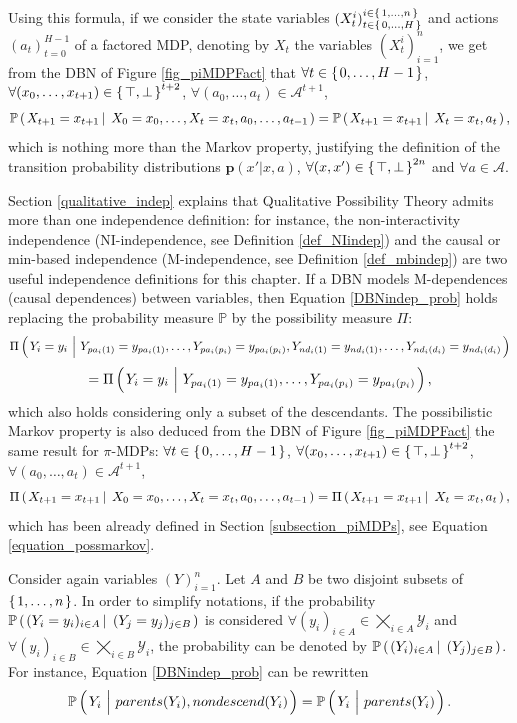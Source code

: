 Using this formula, if we consider the state variables $(X^i_t)_{t \in \left\{ \left. 0,\ldots,H \right. \right\}}^{i \in \left\{ \left. 1,\ldots,n \right. \right\}}$
and actions $(a_t)_{t=0}^{H-1}$
of a factored MDP, 
denoting by $X_t$ the variables $(X^i_t)_{i=1}^n$,
we get from the DBN of Figure \ref{fig_piMDPFact} that
$\forall t \in \left\{ \left.  0,\ldots, H-1 \right. \right\}$, $\forall (x_0,\ldots,x_{t+1}) \in \left\{ \left.  \top, \bot  \right. \right\}^{t+2}$, $\forall (a_0,\ldots,a_t) \in \mathcal{A}^{t+1}$,
\[ \mathbb{P} \left( \left.  X_{t+1}=x_{t+1} \, \right| \left. \, X_0=x_0, \ldots, X_t=x_t, a_0,\ldots,a_{t-1}  \right. \right) = \mathbb{P} \left( \left.  X_{t+1}=x_{t+1} \, \right| \left. \, X_t=x_t, a_t  \right. \right), \]
which is nothing more than the Markov property,
justifying the definition of the transition probability distributions $\textbf{p}(x' \vert x, a)$,
$\forall (x,x') \in \left\{ \left.  \top, \bot  \right. \right\}^{2n}$ and $\forall a \in \mathcal{A}$.

Section \ref{qualitative_indep} explains that Qualitative Possibility Theory 
admits more than one independence definition:
for instance, the non-interactivity independence (NI-independence, see Definition \ref{def_NIindep}) 
and the causal or min-based independence (M-independence, see Definition \ref{def_mbindep})
are two useful independence definitions for this chapter.
If a DBN models M-dependences (causal dependences) 
between variables, 
then Equation \ref{DBNindep_prob} holds 
replacing the probability measure $\mathbb{P}$ 
by the possibility measure $\Pi$:
\[\Pi \paren{ Y_i=y_i \ \Big\vert \ Y_{pa_i(1)}=y_{pa_i(1)},\ldots, Y_{pa_i(p_i)}=y_{pa_i(p_i)}, Y_{nd_i(1)} = y_{nd_i(1)}, \ldots, Y_{nd_i(d_i)} = y_{nd_i(d_i)} }  \]
\begin{equation}
\label{DBN_M_indep}
= \Pi \left( \left.  Y_i=y_i \ \Big\vert \ Y_{pa_i(1)}=y_{pa_i(1)},\ldots, Y_{pa_i(p_i)}=y_{pa_i(p_i)}  \right. \right),
\end{equation}
which also holds considering only a subset of the descendants.
The possibilistic Markov property is also deduced from 
the DBN of Figure \ref{fig_piMDPFact} the same result for $\pi$-MDPs:
$\forall t \in \left\{ \left.  0,\ldots, H-1 \right. \right\}$, $\forall (x_0,\ldots,x_{t+1}) \in \left\{ \left.  \top, \bot  \right. \right\}^{t+2}$, $\forall (a_0,\ldots,a_t) \in \mathcal{A}^{t+1}$,
\[ \Pi \left( \left.  X_{t+1}=x_{t+1} \, \right| \left. \, X_0=x_0, \ldots, X_t=x_t, a_0,\ldots,a_{t-1}  \right. \right) = \Pi \left( \left.  X_{t+1}=x_{t+1} \, \right| \left. \, X_t=x_t, a_t  \right. \right), \]
which has been already defined in Section \ref{subsection_piMDPs}, see Equation \ref{equation_possmarkov}.

Consider again variables $(Y)_{i=1}^n$.
Let $A$ and $B$ be two disjoint subsets
of $\left\{ \left. 1,\ldots,n \right. \right\}$. 
In order to simplify notations,
if the probability 
$\mathbb{P} \left( \left.  (Y_i=y_i)_{i \in A} \, \right| \left. \, (Y_j=y_j)_{j \in B}   \right. \right)$
is considered $\forall (y_i)_{i \in A} \in \bigtimes_{i \in A} \mathcal{Y}_i$
and $\forall(y_i)_{i \in B} \in \bigtimes_{i \in B} \mathcal{Y}_i$,
the probability can be denoted by 
$\mathbb{P} \left( \left.  (Y_i)_{i \in A} \, \right| \left. \, (Y_j)_{j \in B}  \right. \right)$.
For instance, Equation \ref{DBNindep_prob} can be rewritten
\[ \mathbb{P} \paren{ Y_i \ \Big\vert \ parents(Y_i), nondescend(Y_i) } = \mathbb{P} \paren{ Y_i \ \Big\vert \ parents(Y_i) }. \]

